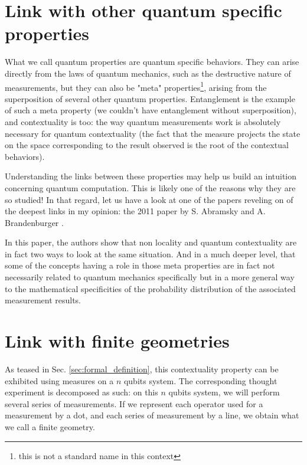 \documentclass{article}
\begin{document}
\section{Link with other quantum specific properties}
\label{sec:link_with_other_quantum_specific_properties}

What we call quantum properties are quantum specific behaviors. They can arise
directly from the laws of quantum mechanics, such as the destructive nature of
measurements, but they can also be "meta" properties\footnote{this is not a
standard name in this context}, arising from the superposition of several other
quantum properties. Entanglement is the example of such a meta property
(we couldn't have entanglement without superposition), and contextuality is too:
the way quantum measurements work is absolutely necessary for quantum
contextuality (the fact that the measure projects the state on the space
corresponding to the result observed is the root of the contextual behaviors).

Understanding the links between these properties may help us build an intuition
concerning quantum computation. This is likely one of the reasons why they are
so studied! In that regard, let us have a look at one of the papers reveling on
of the deepest links in my opinion: the 2011 paper by S. Abramsky and A.
Brandenburger \cite{AB11}.

In this paper, the authors show that non locality and quantum contextuality are
in fact two ways to look at the same situation. And in a much deeper level, that
some of the concepts having a role in those meta properties are in fact not
necessarily related to quantum mechanics specifically but in a more general way
to the mathematical specificities of the probability distribution of the
associated measurement results.

\section{Link with finite geometries}
\label{sec:link_with_finite_geometries}

As teased in Sec. \ref{sec:formal_definition}, this contextuality property can
be exhibited using measures on a $n$ qubits system. The corresponding thought
experiment is decomposed as such: on this $n$ qubits system, we will perform
several series of measurements. If we represent each operator used for a
measurement by a dot, and each series of measurement by a line, we obtain what we
call a finite geometry. 
\end{document}
